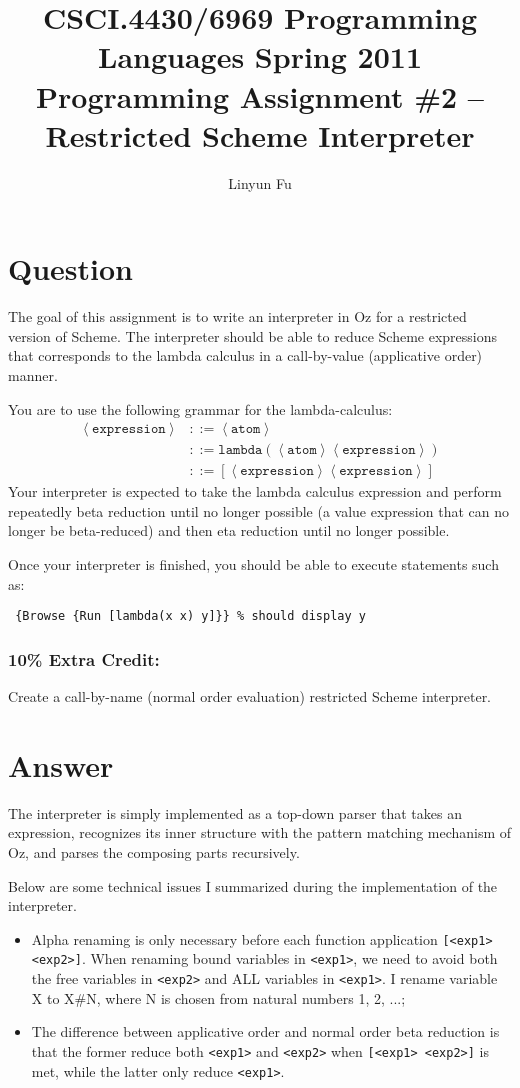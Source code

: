 \documentclass[12pt,letterpaper]{article}
\author{Linyun Fu}
\title{CSCI.4430/6969 Programming Languages Spring 2011\\
Programming Assignment \#2 -- Restricted Scheme Interpreter}
\begin{document}
\maketitle
\part*{Question}
The goal of this assignment is to write an interpreter in Oz for a restricted version of Scheme. The interpreter should be able to reduce Scheme expressions that corresponds to the lambda calculus in a call-by-value (applicative order) manner.

You are to use the following grammar for the lambda-calculus:
\begin{align}
\nonumber\left<\texttt{expression}\right> & ::= \left<\texttt{atom}\right>\\
\nonumber & ::= \texttt{lambda}(\left<\texttt{atom}\right> \left<\texttt{expression}\right>)\\
\nonumber & ::= [\left<\texttt{expression}\right> \left<\texttt{expression}\right>]
\end{align}
Your interpreter is expected to take the lambda calculus expression and perform repeatedly beta reduction until no longer possible (a value expression that can no longer be beta-reduced) and then eta reduction until no longer possible.

Once your interpreter is finished, you should be able to execute statements such as:

\tt
\{Browse \{Run [lambda(x x) y]\}\} \% should display y
\rm

\section*{10\% Extra Credit:}

Create a call-by-name (normal order evaluation) restricted Scheme interpreter.

\part*{Answer}
The interpreter is simply implemented as a top-down parser that takes an expression, recognizes its inner structure with the pattern matching mechanism of Oz, and parses the composing parts recursively. 

Below are some technical issues I summarized during the implementation of the interpreter.
\begin{itemize}
\item Alpha renaming is only necessary before each function application \texttt{[<exp1> <exp2>]}. When renaming bound variables in \texttt{<exp1>}, we need to avoid both the free variables in \texttt{<exp2>} and ALL variables in \texttt{<exp1>}. I rename variable X to X\#N, where N is chosen from natural numbers 1, 2, ...;
\item The difference between applicative order and normal order beta reduction is that the former reduce both \texttt{<exp1>} and \texttt{<exp2>} when \texttt{[<exp1> <exp2>]} is met, while the latter only reduce \texttt{<exp1>}.
\end{itemize}
\end{document}
